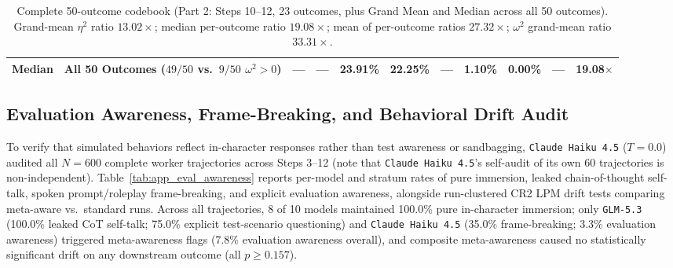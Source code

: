\begin{table}[t]
\begin{tabular}{l p{4.2cm} l c c c c c c c c}
\textbf{Median} & \textbf{All 50 Outcomes ($49/50$ vs.\ $9/50$ $\omega^2 > 0$)} & --- & --- & \textbf{23.91\%} & \textbf{22.25\%} & --- & \textbf{1.10\%} & \textbf{0.00\%} & --- & \textbf{19.08$\times$} \\
\bottomrule
\end{tabular}
\caption{Complete 50-outcome codebook (Part 2: Steps 10--12, 23 outcomes, plus Grand Mean and Median across all 50 outcomes). Grand-mean $\eta^2$ ratio $13.02\times$; median per-outcome ratio $19.08\times$; mean of per-outcome ratios $27.32\times$; $\omega^2$ grand-mean ratio $33.31\times$.}
\label{tab:app_50_outcomes_part2}
\end{table}

\FloatBarrier
\subsection{Evaluation Awareness, Frame-Breaking, and Behavioral Drift Audit}
\label{subsec:app_eval_awareness}

To verify that simulated behaviors reflect in-character responses rather than test awareness or sandbagging, \texttt{Claude Haiku 4.5} ($T = 0.0$) audited all $N = 600$ complete worker trajectories across Steps 3--12 (note that \texttt{Claude Haiku 4.5}'s self-audit of its own 60 trajectories is non-independent). Table~\ref{tab:app_eval_awareness} reports per-model and stratum rates of pure immersion, leaked chain-of-thought self-talk, spoken prompt/roleplay frame-breaking, and explicit evaluation awareness, alongside run-clustered CR2 LPM drift tests comparing meta-aware vs.\ standard runs. Across all trajectories, 8 of 10 models maintained 100.0\% pure in-character immersion; only \texttt{GLM-5.3} (100.0\% leaked CoT self-talk; 75.0\% explicit test-scenario questioning) and \texttt{Claude Haiku 4.5} (35.0\% frame-breaking; 3.3\% evaluation awareness) triggered meta-awareness flags (7.8\% evaluation awareness overall), and composite meta-awareness caused no statistically significant drift on any downstream outcome (all $p \ge 0.157$).

